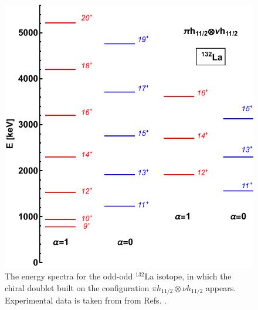 \begin{figure}
    \centering
    \includegraphics[scale=0.8]{Chapters/Figures/chiral_bands_132La.pdf}
    \caption{The energy spectra for the odd-odd $^{132}$La isotope, in which the chiral doublet built on the configuration $\pi h_{11/2}\otimes\nu h_{11/2}$ appears. Experimental data is taken from from Refs. \cite{grodner2004dsam,grodner2005lifetime}.}
    \label{chiral-bands-2}
\end{figure}


